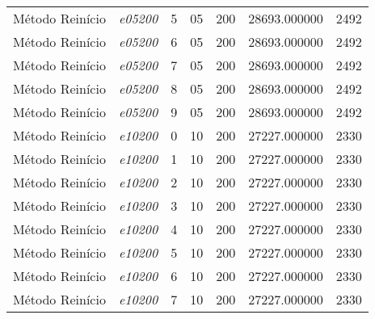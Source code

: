 {\begin{longtable}{cc|c|cc|cc}
			Método Reinício    & \textit{e05200}    & 5                               & 05               & 200              & 28693.000000                          & 2492 \\ 
			Método Reinício    & \textit{e05200}    & 6                               & 05               & 200              & 28693.000000                          & 2492 \\ 
			Método Reinício    & \textit{e05200}    & 7                               & 05               & 200              & 28693.000000                          & 2492 \\ 
			Método Reinício    & \textit{e05200}    & 8                               & 05               & 200              & 28693.000000                          & 2492 \\ 
			Método Reinício    & \textit{e05200}    & 9                               & 05               & 200              & 28693.000000                          & 2492 \\ \hline
			Método Reinício    & \textit{e10200}    & 0                               & 10               & 200              & 27227.000000                          & 2330 \\ 
			Método Reinício    & \textit{e10200}    & 1                               & 10               & 200              & 27227.000000                          & 2330 \\ 
			Método Reinício    & \textit{e10200}    & 2                               & 10               & 200              & 27227.000000                          & 2330 \\ 
			Método Reinício    & \textit{e10200}    & 3                               & 10               & 200              & 27227.000000                          & 2330 \\ 
			Método Reinício    & \textit{e10200}    & 4                               & 10               & 200              & 27227.000000                          & 2330 \\ 
			Método Reinício    & \textit{e10200}    & 5                               & 10               & 200              & 27227.000000                          & 2330 \\ 
			Método Reinício    & \textit{e10200}    & 6                               & 10               & 200              & 27227.000000                          & 2330 \\ 
			Método Reinício    & \textit{e10200}    & 7                               & 10               & 200              & 27227.000000                          & 2330 \\ 

\end{longtable}}
